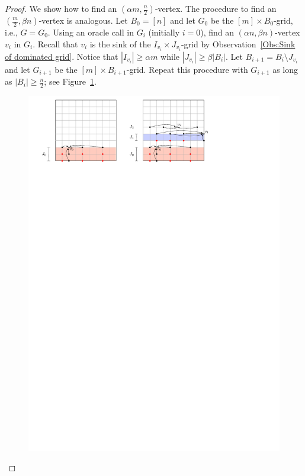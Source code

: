 \documentclass[a4paper,10pt]{article}
\begin{document}
\begin{proof}
We show how to find an $(\alpha m,  \frac{n}{2})$-vertex. The procedure to find an $( \frac{m}{2}, \beta n)$-vertex is analogous.
Let $B_0 = [n]$ and let $G_0$ be the $[m]\times B_0$-grid, i.e., $G = G_0$.
Using an oracle call in $G_i$ (initially $i = 0$), find an $(\alpha n, \beta n)$-vertex $v_i$ in $G_i$. 
Recall that $v_i$ is the sink of the $I_{v_i}\times J_{v_i}$-grid by Observation~\ref{Obs:Sink of dominated grid}.
Notice that $|I_{v_i}| \geq \alpha m$ while $|J_{v_i}| \geq \beta |B_i|$.
Let $B_{i+1} = B_i\setminus J_{v_i}$ and let $G_{i+1}$ be the $[m]\times B_{i+1}$-grid. 
Repeat this procedure with $G_{i+1}$ as long as $|B_i| \geq  \frac{n}{2}$; see Figure~\ref{fig:Climbing Lemma}.

\begin{figure}[h]
\centering
\includegraphics[width=1\textwidth]{ClimbingLemma.pdf}
\caption{\small }
\label{fig:Climbing Lemma}
\end{figure}


\end{proof}
\end{document}
